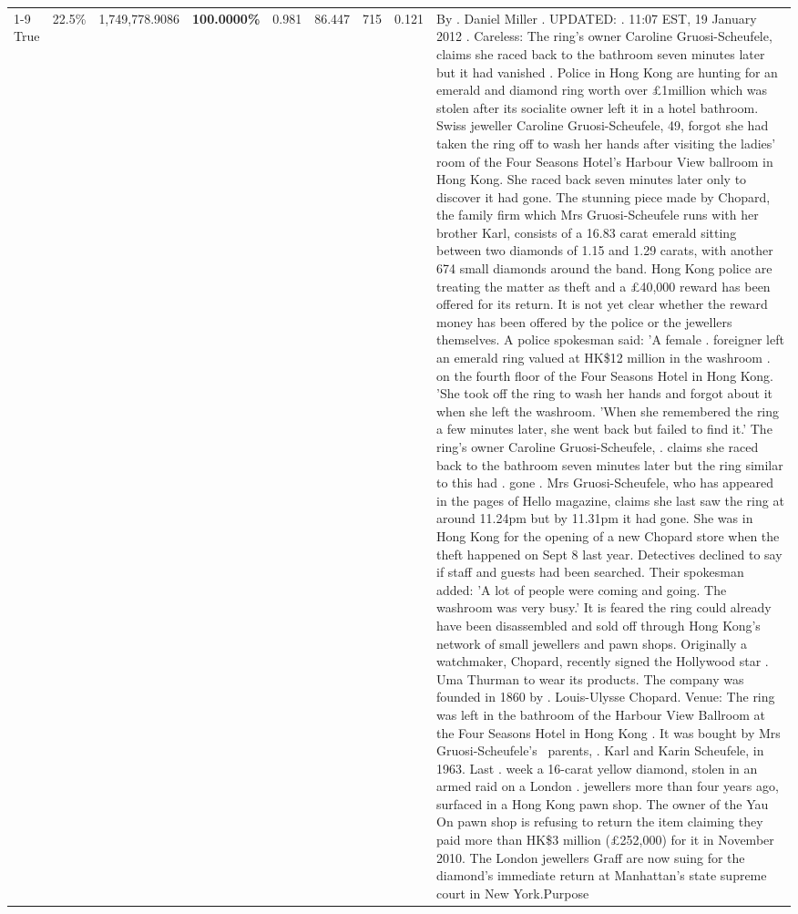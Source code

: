 \begin{table}[H]
\begin{tabular}{lllrlllll}
\cline{1-9} \cline{2-9}
True & 22.5\% & 1,749,778.9086 & \bfseries \color{red} 100.0000\% & 0.981 & 86.447 & 715 & 0.121 & By . Daniel Miller . UPDATED: . 11:07 EST, 19 January 2012 . Careless: The ring's owner Caroline Gruosi-Scheufele, claims she raced back to the bathroom seven minutes later but it had vanished . Police in Hong Kong are hunting for an emerald and diamond ring worth over £1million which was stolen after its socialite owner left it in a hotel bathroom. Swiss jeweller Caroline Gruosi-Scheufele, 49, forgot she had taken the ring off to wash her hands after visiting the ladies' room of the Four Seasons Hotel's Harbour View ballroom in Hong Kong. She raced back seven minutes later only to discover it had gone. The stunning piece made by Chopard, the family firm which Mrs Gruosi-Scheufele runs with her brother Karl, consists of a 16.83 carat emerald sitting between two diamonds of 1.15 and 1.29 carats, with another 674 small diamonds around the band. Hong Kong police are treating the matter as theft and a £40,000 reward has been offered for its return. It is not yet clear whether the reward money has been offered by the police or the jewellers themselves. A police spokesman said: 'A female . foreigner left an emerald ring valued at HK\$12 million in the washroom . on the fourth floor of the Four Seasons Hotel in Hong Kong. 'She took off the ring to wash her hands and forgot about it when she left the washroom. 'When she remembered the ring a few minutes later, she went back but failed to find it.' The ring's owner Caroline Gruosi-Scheufele, . claims she raced back to the bathroom seven minutes later but the ring similar to this had . gone . Mrs Gruosi-Scheufele, who has appeared in the pages of Hello magazine, claims she last saw the ring at around 11.24pm but by 11.31pm it had gone. She was in Hong Kong for the opening of a new Chopard store when the theft happened on Sept 8 last year. Detectives declined to say if staff and guests had been searched. Their spokesman added: 'A lot of people were coming and going. The washroom was very busy.' It is feared the ring could already have been disassembled and sold off through Hong Kong's network of small jewellers and pawn shops. Originally a watchmaker, Chopard, recently signed the Hollywood star . Uma Thurman to wear its products. The company was founded in 1860 by . Louis-Ulysse Chopard. Venue: The ring was left in the bathroom of the Harbour View Ballroom at the Four Seasons Hotel in Hong Kong . It was bought by Mrs Gruosi-Scheufele's  parents, . Karl and Karin Scheufele, in 1963. Last . week a 16-carat yellow diamond, stolen in an armed raid on a London . jewellers more than four years ago, surfaced in a Hong Kong pawn shop. The owner of the Yau On pawn shop is refusing to return the item claiming they paid more than HK\$3 million (£252,000) for it in November 2010. The London jewellers Graff are now suing for the diamond’s immediate return at Manhattan’s state supreme court in New York.Purpose \\

\end{tabular}
\end{table}

